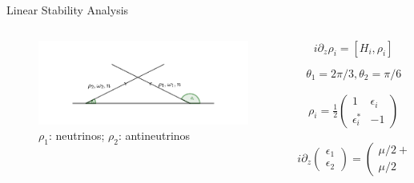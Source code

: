 \documentclass[9pt]{beamer}
\begin{document}
\begin{darkframes}
\begin{frame}{Linear Stability Analysis}
\begin{columns}[T]
   \begin{column}{0.55\textwidth}
   \begin{figure}
      \includegraphics[width=\textwidth]{assets/two-beams-model-sym}
      \caption*{$\rho_1$: neutrinos; $\rho_2$: antineutrinos}
   \end{figure}
   \end{column}%
\begin{column}{0.45\textwidth}

   \begin{equation*}
   i \partial_z \rho_i = \left[ H_i, \rho_i \right]
   \end{equation*}

   \begin{equation*}
   \theta_1 =  2\pi/3, \theta_2 = \pi/6
   \end{equation*}

\pause

   \begin{align*}
      \rho_i = \frac{1}{2}\begin{pmatrix}
      1 & \epsilon_i\\
      \epsilon_i^* & -1
      \end{pmatrix}
   \end{align*}

\pause

\small
\begin{equation*}
i\partial_{z}\begin{pmatrix}
\epsilon_1 \\
\epsilon_2
\end{pmatrix} = \begin{pmatrix}
\mu/2 + \omega_{\mathrm v}   &  -\mu/2  \\
\mu/2 & -\omega_{\mathrm v} - \mu/2
\end{pmatrix}\begin{pmatrix}
\epsilon_1 \\
\epsilon_2
\end{pmatrix}
\end{equation*}



\end{column}
\end{columns}
\end{frame}
\end{darkframes}
\end{document}
